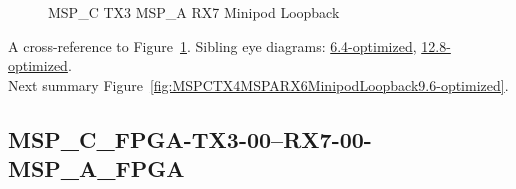 \begin{figure}[h]
\begin{subfigure}{0.33\textwidth}
\hyperref[sec:MSPCFPGATX306RX706MSPAFPGA9.6-optimized]{}
\end{subfigure}\hspace*{\fill}
\begin{subfigure}{0.33\textwidth}
\hyperref[sec:MSPCFPGATX307RX707MSPAFPGA9.6-optimized]{}
\end{subfigure}\hspace*{\fill}
\begin{subfigure}{0.33\textwidth}
\hyperref[sec:MSPCFPGATX308RX708MSPAFPGA9.6-optimized]{}
\end{subfigure}

\begin{subfigure}{0.33\textwidth}
\hyperref[sec:MSPCFPGATX309RX709MSPAFPGA9.6-optimized]{}
\end{subfigure}\hspace*{\fill}
\begin{subfigure}{0.33\textwidth}
\hyperref[sec:MSPCFPGATX310RX710MSPAFPGA9.6-optimized]{}
\end{subfigure}\hspace*{\fill}
\begin{subfigure}{0.33\textwidth}
\hyperref[sec:MSPCFPGATX311RX711MSPAFPGA9.6-optimized]{}
\end{subfigure}

\caption{MSP\_C TX3 MSP\_A RX7 Minipod Loopback} \label{fig:MSPCTX3MSPARX7MinipodLoopback9.6-optimized}
\end{figure}

A cross-reference to Figure~\ref{fig:MSPCTX3MSPARX7MinipodLoopback9.6-optimized}.
Sibling eye diagrams: \hyperref[sec:MSPCTX3MSPARX7MinipodLoopback6.4-optimized]{6.4-optimized}, \hyperref[sec:MSPCTX3MSPARX7MinipodLoopback12.8-optimized]{12.8-optimized}. \\
Next summary Figure~\ref{fig:MSPCTX4MSPARX6MinipodLoopback9.6-optimized}.
\clearpage
% 
\subsection{MSP\_C\_FPGA-TX3-00--RX7-00-MSP\_A\_FPGA}\label{sec:MSPCFPGATX300RX700MSPAFPGA9.6-optimized}

